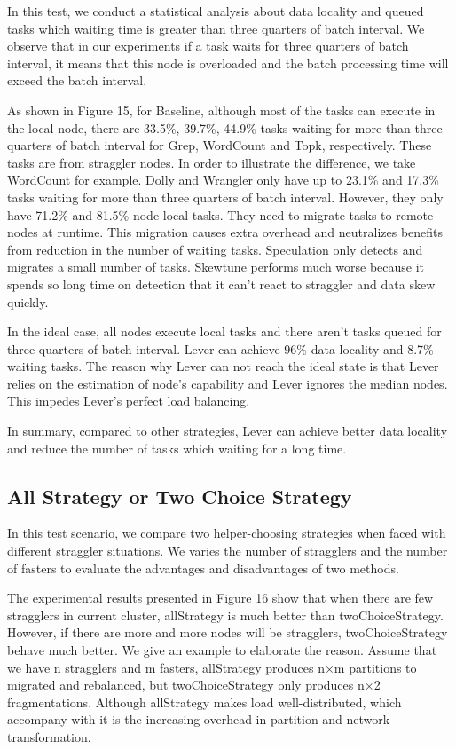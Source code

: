 \documentclass[10pt,conference,compsocconf,letterpaper]{IEEEtran}
\begin{document}
  In this test, we conduct a statistical analysis about data locality and queued tasks which waiting time is greater than three quarters of batch interval. We observe that in our experiments if a task waits for three quarters of batch interval, it means that this node is overloaded and the batch processing time will exceed the batch interval.

  As shown in Figure 15, for Baseline, although most of the tasks can execute in the local node, there are 33.5\%, 39.7\%, 44.9\% tasks waiting for more than three quarters of batch interval for Grep, WordCount and Topk, respectively. These tasks are from straggler nodes. In order to illustrate the difference, we take WordCount for example. Dolly and Wrangler only have up to 23.1\% and 17.3\% tasks waiting for more than three quarters of batch interval. However, they only have 71.2\% and 81.5\% node local tasks. They need to migrate tasks to remote nodes at runtime. This migration causes extra overhead and neutralizes benefits from reduction in the number of waiting tasks. Speculation only detects and migrates a small number of tasks. Skewtune performs much worse because it spends so long time on detection that it can't react to straggler and data skew quickly.

  In the ideal case, all nodes execute local tasks and there aren't tasks queued for three quarters of batch interval. Lever can achieve 96\% data locality and 8.7\% waiting tasks. The reason why Lever can not reach the ideal state is that Lever relies on the estimation of node's capability and Lever ignores the median nodes. This impedes Lever's perfect load balancing.

  In summary, compared to other strategies, Lever can achieve better data locality and reduce the number of tasks which waiting for a long time.

\subsection{All Strategy or Two Choice Strategy}

  In this test scenario, we compare two helper-choosing strategies when faced with different straggler situations. We varies the number of stragglers and the number of fasters to evaluate the advantages and disadvantages of two methods.

  The experimental results presented in Figure 16 show that when there are few stragglers in current cluster, allStrategy is much better than twoChoiceStrategy. However, if there are more and more nodes will be stragglers, twoChoiceStrategy behave much better. We give an example to elaborate the reason. Assume that we have n stragglers and m fasters, allStrategy produces n$\times$m partitions to migrated and rebalanced, but twoChoiceStrategy only produces n$\times$2 fragmentations. Although allStrategy makes load well-distributed, which accompany with it is the increasing overhead in partition and network transformation.
\end{document}

